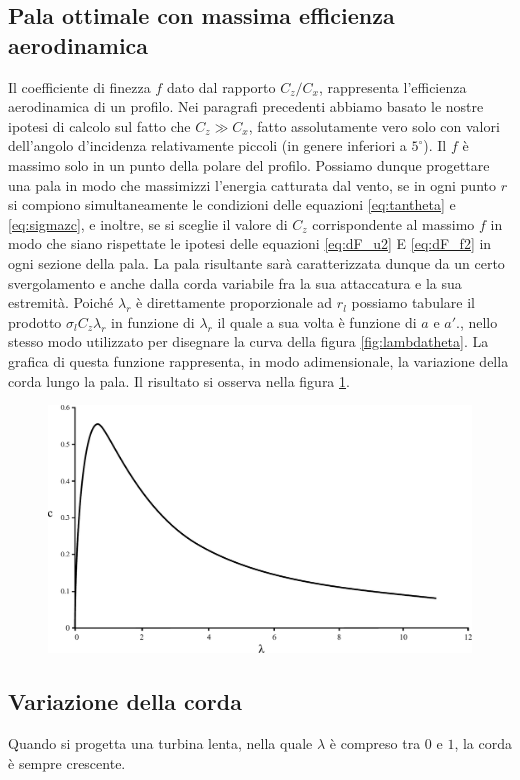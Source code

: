 \subsection{Pala ottimale con massima efficienza aerodinamica}
Il coefficiente di finezza $f$ dato dal rapporto $C_z/C_x$, rappresenta l'efficienza aerodinamica di un profilo. Nei paragrafi precedenti abbiamo basato le nostre ipotesi di calcolo sul fatto che $C_z \gg C_x $, fatto assolutamente vero solo con valori dell'angolo d'incidenza relativamente piccoli (in genere inferiori a $5^\circ$). Il $f$ è massimo solo in un punto della polare del profilo. Possiamo dunque progettare una pala in modo che massimizzi l'energia catturata dal vento, se in ogni punto $r$ si compiono simultaneamente le condizioni delle equazioni \ref{eq:tantheta} e \ref{eq:sigmazc}, e inoltre, se si sceglie il valore di $C_z$ corrispondente al massimo $f$ in modo che siano rispettate le ipotesi delle equazioni \ref{eq:dF_u2} E \ref{eq:dF_f2} in ogni sezione della pala. La pala risultante sarà caratterizzata dunque da un certo svergolamento e anche dalla corda variabile fra la sua attaccatura e la sua estremità. Poiché $\lambda_r$ è direttamente proporzionale ad $r_l$ possiamo tabulare il prodotto $\sigma_l C_z \lambda_r$ in funzione di $\lambda_r$ il quale a sua volta è funzione di $a$ e $a'$., nello stesso modo utilizzato per disegnare la curva della figura \ref{fig:lambdatheta}. La grafica di questa funzione rappresenta, in modo adimensionale, la variazione della corda lungo la pala. Il risultato si osserva nella figura \ref{fig:lambdacz}.
\begin{figure}[h!]
\centering
  \includegraphics[width=.7\textwidth]{fig/lambdacz.pdf}
\caption{}
\label{fig:lambdacz}
\end{figure}
\subsection{Variazione della corda}
Quando si progetta una turbina lenta, nella quale $\lambda$ è compreso tra $0$ e $1$, la corda è sempre crescente. 

